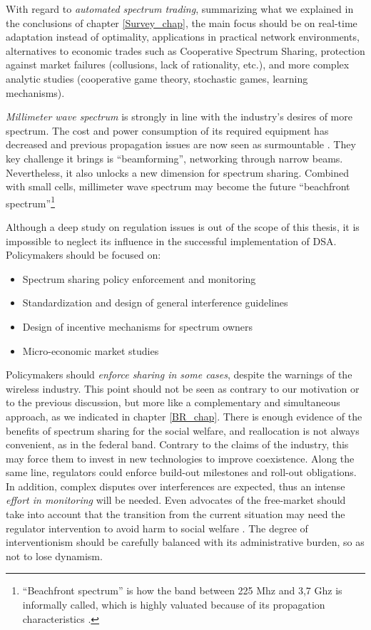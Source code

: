 With regard to \textit{automated spectrum trading}, summarizing what we explained in the conclusions of chapter \ref{Survey_chap}, the main focus should be on real-time adaptation instead of optimality, applications in practical network environments, alternatives to economic trades such as Cooperative Spectrum Sharing, protection against market failures (collusions, lack of rationality, etc.), and more complex analytic studies (cooperative game theory, stochastic games, learning mechanisms).

\textit{Millimeter wave spectrum} is strongly in line with the industry's desires of more spectrum. The cost and power consumption of its required equipment has decreased and previous propagation issues are now seen as surmountable \cite{ref:Andrews2014}. They key challenge it brings is \enquote{beamforming}, networking through narrow beams. Nevertheless, it also unlocks a new dimension for spectrum sharing. Combined with small cells, millimeter wave spectrum may become the future \enquote{beachfront spectrum}\footnote{\enquote{Beachfront spectrum} is how the band between 225 Mhz and 3,7 Ghz is informally called, which is highly valuated because of its propagation characteristics \cite{AdvisorsonScience}.}

Although a deep study on regulation issues is out of the scope of this thesis, it is impossible to neglect its influence in the successful implementation of DSA. Policymakers should be focused on: 
\begin{itemize}
\item Spectrum sharing policy enforcement and monitoring
\item Standardization and design of general interference guidelines
\item Design of incentive mechanisms for spectrum owners
\item Micro-economic market studies 
\end{itemize} 

Policymakers should \textit{enforce sharing in some cases}, despite the warnings of the wireless industry. This point should not be seen as contrary to our motivation or to the previous discussion, but more like a complementary and simultaneous approach, as we indicated in chapter \ref{BR_chap}. There is enough evidence of the benefits of  spectrum sharing for the social welfare, and reallocation is not always convenient, as in the federal band. Contrary to the claims of the industry, this may force them to invest in new technologies to improve coexistence. Along the same line, regulators could enforce build-out milestones and roll-out obligations. In addition, complex disputes over interferences are expected, thus an intense \textit{effort in monitoring} will be needed. Even advocates of the free-market should take into account that the transition from the current situation may need the regulator intervention to avoid harm to social welfare \cite{ref:Yoon2012}. The degree of interventionism should be carefully balanced with its administrative burden, so as not to lose dynamism. 

